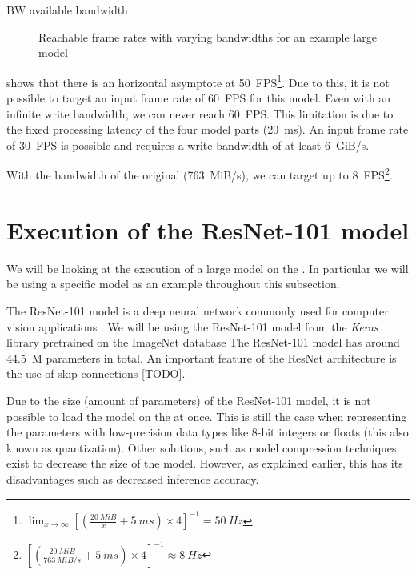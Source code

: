 \begin{eqexpl}[15mm]
    \item{$\textrm{BW}$} available bandwidth
\end{eqexpl}

\begin{figure}
    \centering
    
    \caption{Reachable frame rates with varying bandwidths for an example large model}
    \label{fig:large_model_bandwidth_analysis_example}
\end{figure}

 shows that there is an horizontal asymptote at \SI{50}{FPS}\footnote{ $\lim_{x \to \infty} \left[ \left( \frac{\SI{20}{MiB}}{x} + \SI{5}{ms} \right) \times 4 \right]^{-1} = \SI{50}{Hz}$}.
Due to this, it is not possible to target an input frame rate of \SI{60}{FPS} for this model.
Even with an infinite write bandwidth, we can never reach \SI{60}{FPS}.
This limitation is due to the fixed processing latency of the four model parts (\SI{20}{ms}).
An input frame rate of \SI{30}{FPS} is possible and requires a write bandwidth of at least \SI{6}{GiB/s}.

With the bandwidth of the original \confignoc{} (\SI{763}{MiB/s}), we can target up to \SI{8}{FPS}\footnote{$\left[ \left( \frac{\SI{20}{MiB}}{\SI{763}{MiB/s}} + \SI{5}{ms} \right) \times 4 \right]^{-1} \approx \SI{8}{Hz}$}.
 
\section{Execution of the ResNet-101 model}
We will be looking at the execution of a large model on the \graicore{}.
In particular we will be using a specific model as an example throughout this subsection.

The ResNet-101 model is a deep neural network commonly used for computer vision applications \cite{heDeepResidualLearning2015}.
We will be using the ResNet-101 model from the \textit{Keras} library \cite{KerasDocumentationResNet} pretrained on the ImageNet database \cite{russakovskyImageNetLargeScale2014}
The ResNet-101 model has around \SI{44.5}{M} parameters in total.
An important feature of the ResNet architecture is the use of skip connections \cref{TODO}.

Due to the size (amount of parameters) of the ResNet-101 model, it is not possible to load the model on the \graicore{} at once.
This is still the case when representing the parameters with low-precision data types like 8-bit integers or floats (this also known as quantization).
Other solutions, such as model compression techniques exist to decrease the size of the model.
However, as explained earlier, this has its disadvantages such as decreased inference accuracy.

